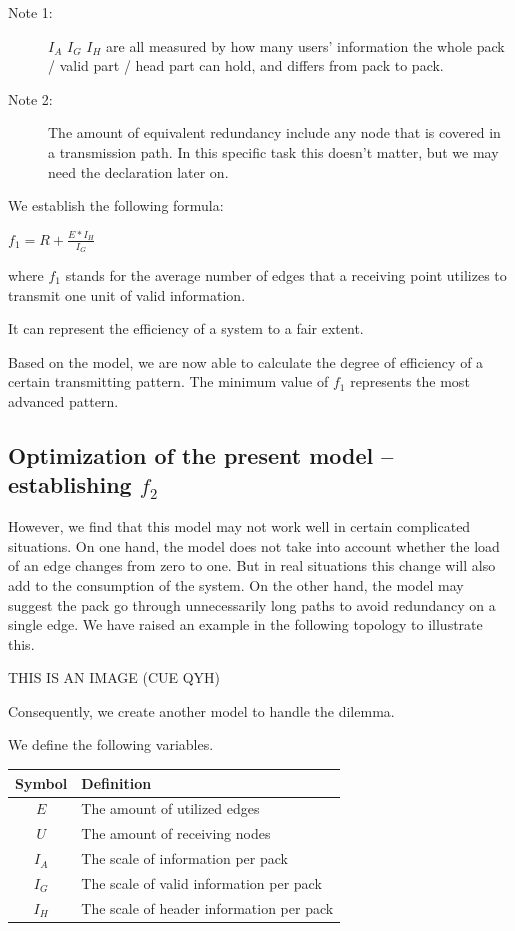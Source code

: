 \documentclass{mcmthesis}
\begin{document}
\begin{description}
\item [Note 1:] $I_{A}$ $I_{G}$ $I_{H}$ are all measured by how many users' information the whole pack / valid part / head part can hold, and differs from pack to pack.
\item [Note 2:] The amount of equivalent redundancy include any node that is covered in a transmission path. In this specific task this doesn't matter, but we may need the declaration later on.
\end{description}

 We establish the following formula:

 \quad$f_1 = R+\frac{E*I_{H}}{I_{G}}$


where $f_1$ stands for the average number of edges that a receiving point utilizes to transmit one unit of valid information.



 It can represent the efficiency of a system to a fair extent.

Based on the model, we are now able to calculate the degree of efficiency of a certain transmitting pattern. The minimum value of $f_1$ represents the most advanced pattern.

\subsection{Optimization of the present model -- establishing $f_2$}

However, we find that this model may not work well in certain complicated situations. On one hand, the model does not take into account whether the load of an edge changes from zero to one. But in real situations this change will also add to the consumption of the system. On the other hand, the model may suggest the pack go through unnecessarily long paths to avoid redundancy on a single edge. We have raised an example in the following topology to illustrate this.

THIS IS AN IMAGE (CUE QYH)

Consequently, we create another model to handle the dilemma. 

We define the following variables.

\begin{center}
	\begin{tabular}{cl}
		\hline
		Symbol & Definition \\
		\hline
		$E$ & The amount of utilized edges\\
		$U$ & The amount of receiving nodes\\
		$I_{A}$ & The scale of information per pack\\ 
		$I_{G}$ & The scale of valid information per pack\\ 
		$I_{H}$ & The scale of header information per pack\\ 
		\hline
	\end{tabular}
\end{center}
\end{document}
